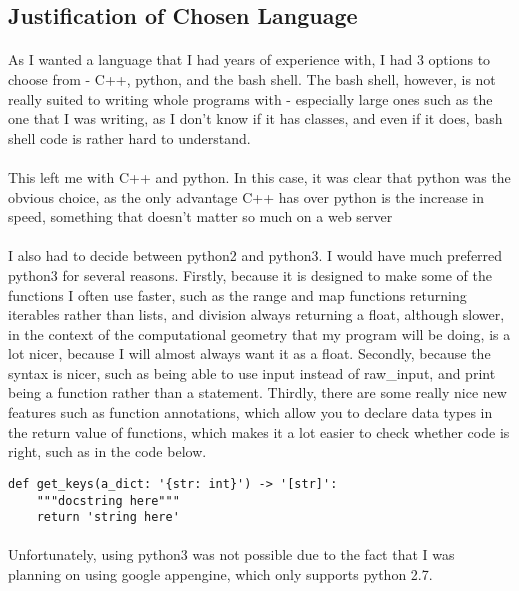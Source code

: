 \subsection{Justification of Chosen Language}
\paragraph{}
As I wanted a language that I had years of experience with, I had 3 options to choose from - C++, python, and the bash shell. The bash shell, however, is not really suited to writing whole programs with - especially large ones such as the one that I was writing, as I don't know if it has classes, and even if it does, bash shell code is rather hard to understand.

\paragraph{}
This left me with C++ and python. In this case, it was clear that python was the obvious choice, as the only advantage C++ has over python is the increase in speed, something that doesn't matter so much on a web server

\paragraph{}
I also had to decide between python2 and python3. I would have much preferred python3 for several reasons. Firstly, because it is designed to make some of the functions I often use faster, such as the range and map functions returning iterables rather than lists, and division always returning a float, although slower, in the context of the computational geometry that my program will be doing, is a lot nicer, because I will almost always want it as a float. Secondly, because the syntax is nicer, such as being able to use input instead of raw\_input, and print being a function rather than a statement. Thirdly, there are some really nice new features such as function annotations, which allow you to declare data types in the return value of functions, which makes it a lot easier to check whether code is right, such as in the code below.

\begin{verbatim}
def get_keys(a_dict: '{str: int}') -> '[str]':
    """docstring here"""
    return 'string here'
\end{verbatim}

\paragraph{}
Unfortunately, using python3 was not possible due to the fact that I was planning on using google appengine, which only supports python 2.7.